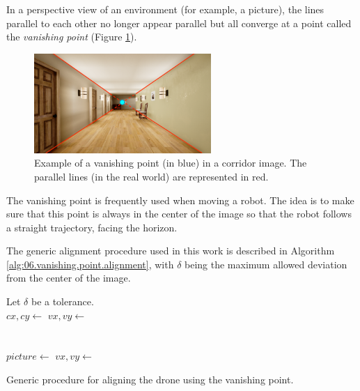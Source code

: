 In a perspective view of an environment (for example, a picture), the lines parallel to each other no longer appear parallel but all converge at a point called the \emph{vanishing point} (Figure \ref{fig:06.vanishing.point.example}).

\begin{figure}[H]
    \centering
    \includegraphics[width=0.6\textwidth]{resources/png/06/vanishing-point/example.png}
    \caption{Example of a vanishing point (in blue) in a corridor image. The parallel lines (in the real world) are represented in red.}
    \label{fig:06.vanishing.point.example}
\end{figure}

The vanishing point is frequently used when moving a robot. The idea is to make sure that this point is always in the center of the image so that the robot follows a straight trajectory, facing the horizon.

The generic alignment procedure used in this work is described in Algorithm \ref{alg:06.vanishing.point.alignment}, with $\delta$ being the maximum allowed deviation from the center of the image.

\begin{algorithm}[H]
    \begin{algorithmic}[1]
            \State Let $\delta$ be a tolerance. \\
            \State $cx, cy \gets$  
            \State $vx, vy \gets$   \\
                    \State {}
                \EndIf \\
                    \State {}
                \EndIf \\
                \State $picture \gets$  
                \State $vx, vy \gets$  
            \EndWhile
        \EndFunction
    \end{algorithmic}
    \caption{Generic procedure for aligning the drone using the vanishing point.}
    \label{alg:06.vanishing.point.alignment}
\end{algorithm}

